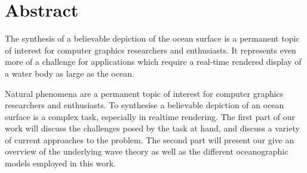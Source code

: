 \chapter*{Abstract}


The synthesis of a believable depiction of the ocean surface is a permanent
topic of interest for computer graphics researchers and enthusiasts. It
represents even more of a challenge for applications which require a
real-time rendered display of a water body as large as the ocean.

Natural phenomena are a permanent topic of interest for computer graphics researchers and enthusiasts. To synthesise a believable
depiction of an ocean surface is a complex task, especially in realtime rendering. The first part of our work will discuss the
challenges posed by the task at hand, and discuss a variety of current approaches to the problem. The second part will present
our give an
overview of the underlying wave theory as well as the different oceanographic models employed in this work.